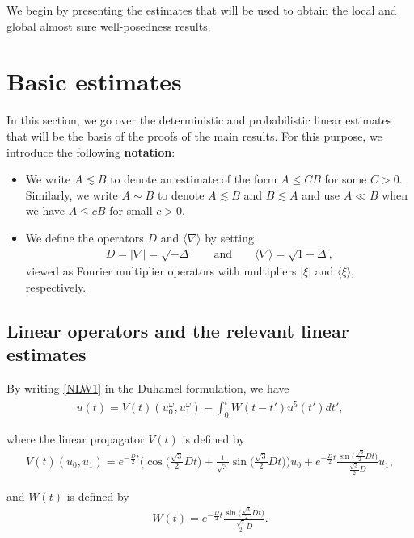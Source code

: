 \documentclass[letterpaper, 11pt,  reqno]{amsart}
\newcommand{\1}{\hspace{0.5mm}\text{I}\hspace{0.2mm}}
\newcommand{\noi}{\noindent}
\newcommand{\nb}{\nabla}
\newcommand{\Dl}{\Delta}
\renewcommand{\o}{\omega}
\newcommand{\les}{\lesssim}
\newcommand{\jb}[1]
{\langle #1 \rangle}
\numberwithin{equation}{section}
\numberwithin{theorem}{section}
\begin{document}
We begin by presenting the estimates that will be used to obtain the local and global almost sure well-posedness results. 


\section{Basic estimates} 

In this section, we go over the deterministic 
and probabilistic linear estimates that will be the basis of the proofs of the main results. 
For this purpose, we introduce the following {\bf{notation}}:

\begin{itemize}
\item
We write $ A \les B $ to denote an estimate of the form $ A \leq CB $ for some $C > 0$.
Similarly, we write  $ A \sim B $ to denote $ A \les B $ and $ B \les A $ and use $ A \ll B $ 
when we have $A \leq c B$ for small $c > 0$.
\item We define the operators $D$ and $\jb{\nb}$ by  setting 
\begin{align}
D = |\nb| = \sqrt{-\Dl} \qquad \text{and}\qquad
\jb{\nb} = \sqrt{ 1- \Dl}, 
\label{nb}
\end{align}
viewed as Fourier multiplier operators
with multipliers $|\xi|$ and $\jb{\xi}$, respectively.
\end{itemize}

\subsection{Linear operators and the relevant linear  estimates}

By writing \eqref{NLW1} in the Duhamel formulation, we have
\begin{align*}
u(t) = V(t) (u_0^\o, u_1^\o) - \int_0^t W(t - t') u^5(t') dt', 
\end{align*}

\noi
where the linear propagator $V(t)$ is defined by 
\begin{align}
V(t) (u_0, u_1)
= e^{- \frac{D}{2}t} \bigg(\cos \big(\tfrac{\sqrt{3}}{2} Dt\big) 
+ \frac{1}{\sqrt{3}}\sin \big(\tfrac{\sqrt{3}}{2} Dt\big) \bigg)u_0
+ e^{- \frac{D}{2}t}\frac{\sin \big(\tfrac{\sqrt{3}}{2} Dt\big)}{\tfrac{\sqrt{3}}{2} D} u_1,
\label{A1}
\end{align}

\noi
and $W(t)$ is defined by 
\begin{align}
W(t) = e^{- \frac{D}{2}t} \frac{\sin \big(\tfrac{\sqrt{3}}{2} Dt\big)}{\tfrac{\sqrt{3}}{2} D}.
\label{A2}
\end{align}
\end{document}
